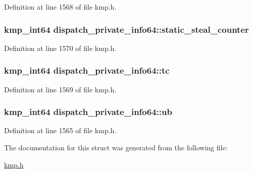 Definition at line 1568 of file kmp.\-h.

\hypertarget{structdispatch__private__info64_aa9a2e92df78d7f5dab022179e5f940d6}{
\subsubsection[{static\-\_\-steal\-\_\-counter}]{\setlength{\rightskip}{0pt plus 5cm}kmp\-\_\-int64 dispatch\-\_\-private\-\_\-info64\-::static\-\_\-steal\-\_\-counter}}\label{structdispatch__private__info64_aa9a2e92df78d7f5dab022179e5f940d6}


Definition at line 1570 of file kmp.\-h.

\hypertarget{structdispatch__private__info64_acf0cb827cb09138d969c157a89cd8f48}{
\subsubsection[{tc}]{\setlength{\rightskip}{0pt plus 5cm}kmp\-\_\-int64 dispatch\-\_\-private\-\_\-info64\-::tc}}\label{structdispatch__private__info64_acf0cb827cb09138d969c157a89cd8f48}


Definition at line 1569 of file kmp.\-h.

\hypertarget{structdispatch__private__info64_a9395a2882f09adccf68ab36b7c797e82}{
\subsubsection[{ub}]{\setlength{\rightskip}{0pt plus 5cm}kmp\-\_\-int64 dispatch\-\_\-private\-\_\-info64\-::ub}}\label{structdispatch__private__info64_a9395a2882f09adccf68ab36b7c797e82}


Definition at line 1565 of file kmp.\-h.



The documentation for this struct was generated from the following file\-:\begin{DoxyCompactItemize}
\item 
\hyperlink{kmp_8h}{kmp.\-h}\end{DoxyCompactItemize}
